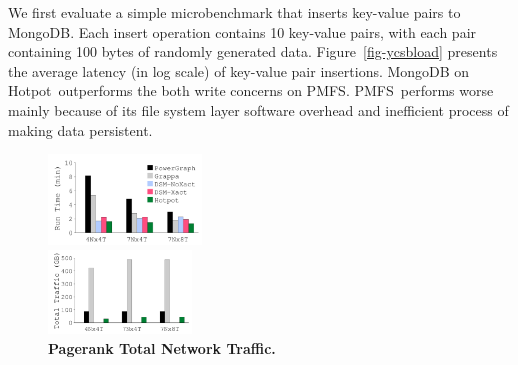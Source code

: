 \documentclass[sigconf]{acmart}
\newcommand{\DIFaddFL}[1]{}
\renewcommand{\em}{\it}
\newcommand{\mycaption}[3]{\caption{\label{#1}{\bf #2} \em\small #3}}
\newcommand{\hotpot}{Hotpot}
\newcommand{\journaled}{JOURNALED}
\newcommand{\fsyncsafe}{FSYNC\_SAFE}
\newcommand{\pmfs}{PMFS}
\providecommand{\DIFadd}[1]{{\protect\color{blue}\uwave{#1}}} %
\providecommand{\DIFaddbegin}{} %
\providecommand{\DIFaddFL}[1]{\DIFadd{#1}} %
\begin{document}
{
We first evaluate a simple microbenchmark that inserts key-value pairs to MongoDB. 
Each insert operation contains 10 key-value pairs, with each pair containing 100 bytes of randomly generated data.
Figure~\ref{fig-ycsbload} presents the average latency (in log scale) of key-value pair insertions. 
MongoDB on \hotpot\ outperforms the both write concerns on \pmfs.
\pmfs\ performs worse mainly because of its file system layer software overhead 
and inefficient process of making data persistent.
\fi


\DIFaddbegin {
\begin{figure}[th]
\begin{minipage}{1.6in}
\begin{center}
\centerline{\includegraphics[width=1.6in]{Figures/g_plot_graph_ATC_runtime.pdf}}
\mycaption{fig-graph-runtime}{Pagerank Total Run Time.}
{
\DIFaddFL{N stands for total number of nodes, T stands for number of threads running on a node.
}}
\end{center}
\end{minipage}
\begin{minipage}{0.01in}
\DIFaddFL{\hspace{0.01in}
}\end{minipage}
\begin{minipage}{1.6in}
\begin{center}
\centerline{\includegraphics[width=1.5in]{Figures/g_plot_graph_ATC_network.pdf}}
\mycaption{fig-graph-traffic}{Pagerank Total Network Traffic.}
{
}
\end{center}
\end{minipage}
\begin{minipage}{0.01in}
\DIFaddFL{\hspace{0.01in}
}
\end{minipage}
\end{figure}}}
\end{document}
